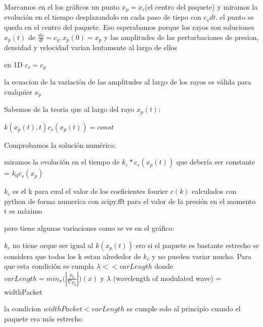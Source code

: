 \documentclass{article}
\begin{document}
\begin{description}
\item Marcamos en el los gráficos un punto $x_p = x_c$(el centro del paquete) y miramos la evolución en el tiempo desplazandolo en cada paso de tiepo con $c_s dt$. el punto se queda en el centro del paquete. Eso esperabamos porque los rayos son soluciones 
$x_p(t)$ de $\frac{dx}{dt} = c_g, x_p(0) = x_p$ y las amplitudes de las perturbaciones de presion, densidad y velocidad varian lentamente al largo de ellos  
\item en 1D $c_s=c_g$
\item la ecuacion de la variación de las amplitudes al largo de los rayos es válida para cualquier $x_p$

\item Sabemos de la teoria que al largo del rayo $x_p(t)$:
\item $k(x_p(t),t)  c_s(x_p(t)) = const$ 
\item Comprobamos la solución numérica: 
\item miramos la evolución en el tiempo de $k_c * c_s(x_p(t)) $ que debería ser constante = $k_0 c_s(x_p)$ 
\item  $k_c$ es el k para cual el valor de los coeficientes fourier $c(k)$ calculados con python 
de forma numerica con scipy.fft para el valor de la presión en el momento t es máximo 
\item pero tiene algunas variaciones como se ve en el gráfico:




\item $k_c$ no tiene orque ser igual al $k(x_p(t))$ ero si el paquete es bastante estrecho se considera que todos los k estan alrededor de $k_c$  y no pueden variar mucho. Para que esta condición se cumpla $\lambda << varLength$ donde 
$varLength =  min_{x}\big(|\frac{\rho_0}{\nabla \rho_0}|\big)(x) $
y $\lambda$ (wavelength of modulated wave) = widthPacket
\item la condicion $widthPacket < varLength$ se cumple solo al principio cuando el paquete era más estrecho


\newpage


 



\end{description}
\end{document}
